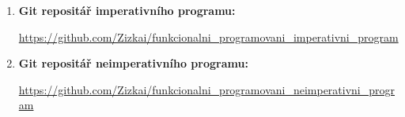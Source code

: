 \documentclass[12pt,a4paper]{report}
\begin{document}
\begin{enumerate}
\item \textbf{Git repositář imperativního programu:} 

\url{https://github.com/Zizkai/funkcionalni_programovani_imperativni_program}

\item \textbf{Git repositář neimperativního programu:}

\url{https://github.com/Zizkai/funkcionalni_programovani_neimperativni_program} 
\end{enumerate}

\openright
\end{document}
